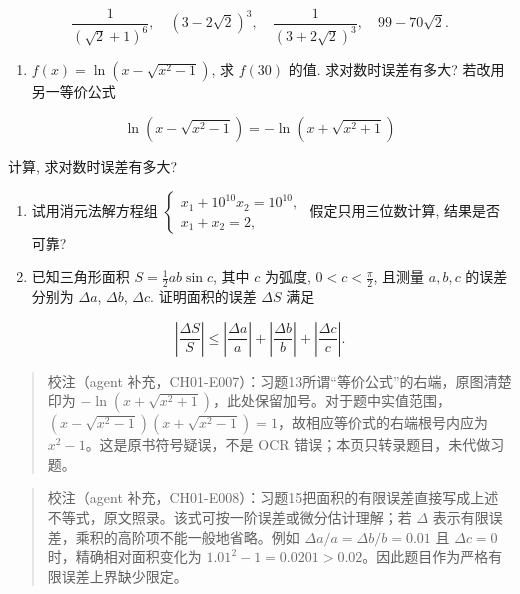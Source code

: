 \documentclass[
  10pt,
  a4paper,
]{article}
\providecommand{\tightlist}{%
  \setlength{\itemsep}{0pt}\setlength{\parskip}{0pt}}
\begin{document}
\[
\frac{1}{(\sqrt{2}+1)^6}, \quad (3-2\sqrt{2})^3, \quad \frac{1}{(3+2\sqrt{2})^3}, \quad 99-70\sqrt{2}.
\]

\begin{enumerate}
\def\labelenumi{\arabic{enumi}.}
\setcounter{enumi}{12}
\tightlist
\item
  \(f(x)=\ln(x-\sqrt{x^2-1})\), 求 \(f(30)\) 的值. 求对数时误差有多大?
  若改用另一等价公式
\end{enumerate}

\[
\ln(x-\sqrt{x^2-1})=-\ln(x+\sqrt{x^2+1})
\]

计算, 求对数时误差有多大?

\begin{enumerate}
\def\labelenumi{\arabic{enumi}.}
\setcounter{enumi}{13}
\item
  试用消元法解方程组
  \(\begin{cases} x_1+10^{10}x_2=10^{10}, \\ x_1+x_2=2, \end{cases}\)
  假定只用三位数计算, 结果是否可靠?
\item
  已知三角形面积 \(S=\frac{1}{2}ab\sin c\), 其中 \(c\) 为弧度,
  \(0<c<\frac{\pi}{2}\), 且测量 \(a, b, c\) 的误差分别为 \(\Delta a\),
  \(\Delta b\), \(\Delta c\). 证明面积的误差 \(\Delta S\) 满足
\end{enumerate}

\[
\left|\frac{\Delta S}{S}\right| \leqslant \left|\frac{\Delta a}{a}\right| + \left|\frac{\Delta b}{b}\right| + \left|\frac{\Delta c}{c}\right|.
\]

\begin{quote}
校注（agent
补充，CH01-E007）：习题13所谓``等价公式''的右端，原图清楚印为
\(-\ln(x+\sqrt{x^2+1})\)，此处保留加号。对于题中实值范围，\((x-\sqrt{x^2-1})(x+\sqrt{x^2-1})=1\)，故相应等价式的右端根号内应为
\(x^2-1\)。这是原书符号疑误，不是 OCR 错误；本页只转录题目，未代做习题。
\end{quote}

\begin{quote}
校注（agent
补充，CH01-E008）：习题15把面积的有限误差直接写成上述不等式，原文照录。该式可按一阶误差或微分估计理解；若
\(\Delta\) 表示有限误差，乘积的高阶项不能一般地省略。例如
\(\Delta a/a=\Delta b/b=0.01\) 且 \(\Delta c=0\) 时，精确相对面积变化为
\(1.01^2-1=0.0201>0.02\)。因此题目作为严格有限误差上界缺少限定。
\end{quote}
\end{document}
